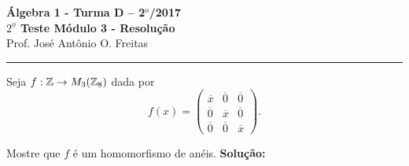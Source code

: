 \documentclass[12pt]{article}
\begin{document}


\begin{center}
{\Large\bf {\'A}lgebra 1 - Turma D -- 2$^{o}$/2017} \\ \vspace{9pt} {\large\bf
  $2^{\underline{o}}$ Teste Módulo 3 - Resolu\c{c}\~ao}\\
\vspace{9pt} Prof. Jos{\'e} Ant{\^o}nio O. Freitas
\end{center}
\hrule

\vspace{.6cm}

Seja $f : \mathbb{Z} \to M_3(\mathbb{Z}_8)$ dada por
\[
	f(x) = \begin{pmatrix}
		\overline{x} & \overline{0} & \overline{0}\\
		\overline{0} & \overline{x} & \overline{0}\\
		\overline{0} & \overline{0} & \overline{x}
	\end{pmatrix}.
\]

\questao Mostre que $f$ é um homomorfismo de anéis.
\noindent\textbf{Solu\c{c}\~ao:}
\end{document}
